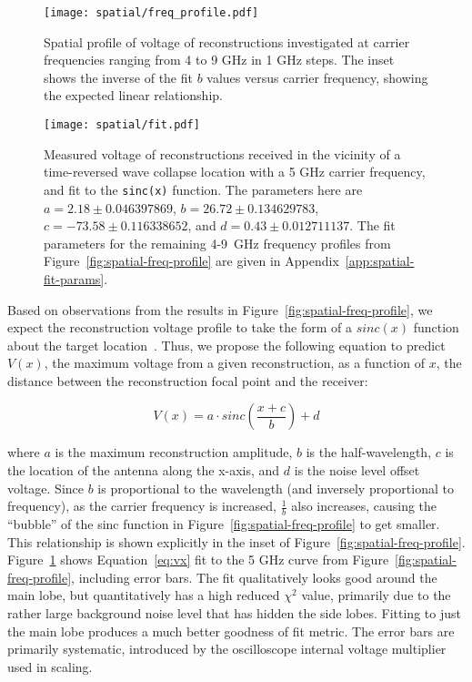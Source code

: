 \begin{figure}
\texttt{[image: spatial/freq\_profile.pdf]}
\caption[Spatial profile of reconstruction at various frequencies]{Spatial profile of \ptp{} voltage of reconstructions investigated at carrier frequencies ranging from 4 to 9 GHz in 1 GHz
steps.  The inset shows the inverse of the fit $b$ values versus carrier frequency, showing the expected linear relationship.}
\label{fig:spatial-freq-profile}

\vspace*{\floatsep}%

\texttt{[image: spatial/fit.pdf]}
\caption[Fit of spatial profile]{Measured \ptp{} voltage of reconstructions received in the
vicinity of a time-reversed wave collapse location with a 5 GHz carrier
frequency, and fit to the \texttt{sinc(x)} function. The parameters here are $a = 2.18 \pm 0.046397869$, $b = 26.72 \pm 0.134629783$, $c = -73.58 \pm 0.116338652$, and $d = 0.43 \pm 0.012711137$. The fit parameters for the remaining 4-9~GHz frequency profiles from Figure~\ref{fig:spatial-freq-profile} are given in Appendix~\ref{app:spatial-fit-params}.}
\label{fig:spatial-error-fit}
\end{figure}

Based on observations from the results in Figure~\ref{fig:spatial-freq-profile}, we expect the reconstruction \ptp{} voltage profile to take the form of a $sinc(x)$ function about the target location~\cite{lerosey-focusing}. Thus, we propose the following equation to predict $V(x)$, the maximum \ptp{} voltage from a given reconstruction, as a function of $x$, the distance between the reconstruction focal point and the receiver:

\begin{equation}
\label{eq:vx}
V(x) = a\cdot sinc\left(\frac{x+c}{b}\right) + d
\end{equation}

where $a$ is the maximum \ptp{} reconstruction amplitude, $b$ is the half-wavelength, $c$ is the location of the antenna along the x-axis, and $d$ is the noise level offset voltage. Since $b$ is proportional to the wavelength (and inversely proportional to frequency), as the carrier frequency is increased,  $\frac{1}{b}$ also increases, causing the ``bubble'' of the sinc function in Figure~\ref{fig:spatial-freq-profile} to get smaller. This relationship is shown explicitly in the inset of Figure~\ref{fig:spatial-freq-profile}. Figure~\ref{fig:spatial-error-fit} shows Equation~\ref{eq:vx} fit to the 5 GHz curve from Figure~\ref{fig:spatial-freq-profile}, including error bars. The fit qualitatively looks good around the main lobe, but quantitatively has a high reduced $\chi^2$ value, primarily due to the rather large background noise level that has hidden the side lobes. Fitting to just the main lobe produces a much better goodness of fit metric. The error bars are primarily systematic, introduced by the oscilloscope internal voltage multiplier used in scaling.


